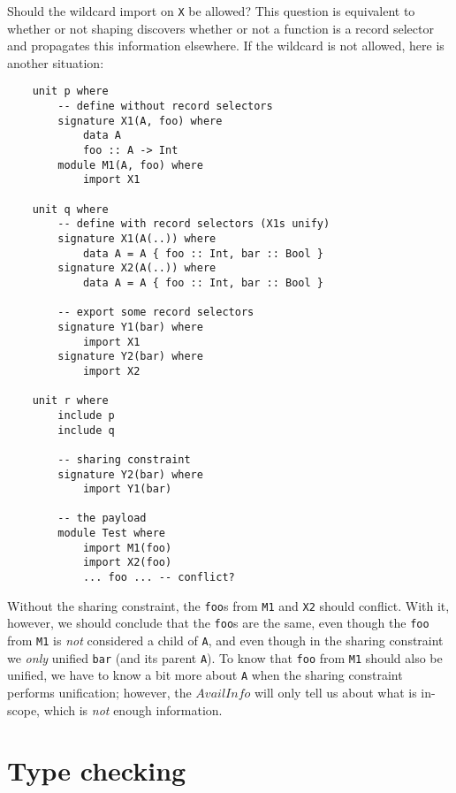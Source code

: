 \documentclass{article}
\newcommand{\I}[1]{\ensuremath{\mathit{#1}}}
\begin{document}
Should the wildcard import on \verb|X| be allowed?
This question is equivalent to whether or not shaping discovers
whether or not a function is a record selector and propagates this
information elsewhere.
If the wildcard is not allowed, here is another situation:

\begin{verbatim}
    unit p where
        -- define without record selectors
        signature X1(A, foo) where
            data A
            foo :: A -> Int
        module M1(A, foo) where
            import X1

    unit q where
        -- define with record selectors (X1s unify)
        signature X1(A(..)) where
            data A = A { foo :: Int, bar :: Bool }
        signature X2(A(..)) where
            data A = A { foo :: Int, bar :: Bool }

        -- export some record selectors
        signature Y1(bar) where
            import X1
        signature Y2(bar) where
            import X2

    unit r where
        include p
        include q

        -- sharing constraint
        signature Y2(bar) where
            import Y1(bar)

        -- the payload
        module Test where
            import M1(foo)
            import X2(foo)
            ... foo ... -- conflict?
\end{verbatim}

Without the sharing constraint, the \verb|foo|s from \verb|M1| and \verb|X2|
should conflict.  With it, however, we should conclude that the \verb|foo|s
are the same, even though the \verb|foo| from \verb|M1| is \emph{not}
considered a child of \verb|A|, and even though in the sharing constraint
we \emph{only} unified \verb|bar| (and its parent \verb|A|).  To know that
\verb|foo| from \verb|M1| should also be unified, we have to know a bit
more about \verb|A| when the sharing constraint performs unification;
however, the \I{AvailInfo} will only tell us about what is in-scope, which
is \emph{not} enough information.


\section{Type checking}
\end{document}
